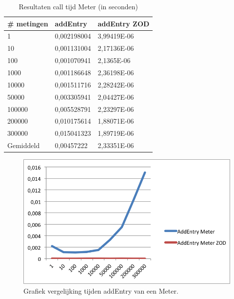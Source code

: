 \begin{table}[]
\centering
\begin{tabular}{|l|l|l|}
\hline
\# metingen & addEntry    & addEntry ZOD \\ \hline
1           & 0,002198004 & 3,99419E-06  \\ \hline
10          & 0,001131004 & 2,17136E-06  \\ \hline
100         & 0,001070941 & 2,1365E-06   \\ \hline
1000        & 0,001186648 & 2,36198E-06  \\ \hline
10000       & 0,001511716 & 2,28242E-06  \\ \hline
50000       & 0,003305941 & 2,04427E-06  \\ \hline
100000      & 0,005528791 & 2,23297E-06  \\ \hline
200000      & 0,010175614 & 1,88071E-06  \\ \hline
300000      & 0,015041323 & 1,89719E-06  \\ \hline
Gemiddeld   & 0,00457222  & 2,33351E-06  \\ \hline
\end{tabular}
\caption{Resultaten call tijd Meter (in seconden)}
\label{Table:Meter}
\end{table}

\begin{figure}[!h]
  \centering
  \includegraphics[scale=1.0]{Afbeeldingen/Evaluatie/AddEntryMeter}
  \caption{Grafiek vergelijking tijden addEntry van een Meter.}
  \label{fig:GraphMeter}
\end{figure}



